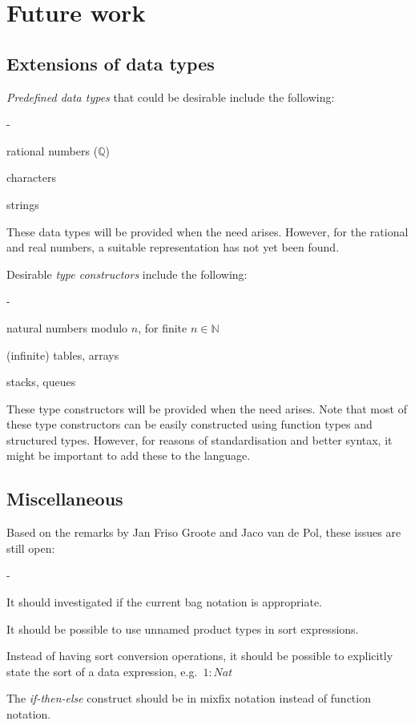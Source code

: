 \documentclass[a4paper,fleqn]{article}
\newenvironment{tdefinitions}[2][0.15em]
  {\begin{list}%
    {#2}%
    {\setlength{\parsep}{0pt}%
     \setlength{\itemsep}{#1}%
     \setlength{\leftmargin}{\mathindent}%
     \setlength{\labelwidth}{\mathindent - \labelsep}%
    }
  }
  {\end{list}}
\newcommand{\frm}[1]{\mbox{\ensuremath{#1}}}
\newcommand{\f}[1]{\ensuremath{\mathit{#1}}}
\newcommand{\nat}{\ensuremath{\mathbb{N}}}
\newlength{\tlength}
\begin{document}
\section{Future work}

\subsection{Extensions of data types}

\emph{Predefined data types} that could be desirable include the following:
\begin{tdefinitions}{-}
\item rational numbers (\frm{\mathbb{Q}})
\item characters
\item strings
\end{tdefinitions}

\noindent
These data types will be provided when the need arises. However, for the
rational and real numbers, a suitable representation has not yet been found.

Desirable \emph{type constructors} include the following:
\begin{tdefinitions}{-}
\item natural numbers modulo \frm{n}, for finite \frm{n \in \nat}
\item (infinite) tables, arrays
\item stacks, queues
\end{tdefinitions}

\noindent
These type constructors will be provided when the need arises. Note that most
of these type constructors can be easily constructed using function types and
structured types. However, for reasons of standardisation and better syntax, it
might be important to add these to the language.

\subsection{Miscellaneous}

Based on the remarks by Jan Friso Groote and Jaco van de Pol, these issues are
still open:
\begin{tdefinitions}{-}
\item It should investigated if the current bag notation is appropriate.
\item It should be possible to use unnamed product types in sort expressions.
\item Instead of having sort conversion operations, it should be possible to
explicitly state the sort of a data expression, e.g.\ \frm{1: \f{Nat}}
\item The \emph{if-then-else} construct should be in mixfix notation instead of
function notation.
\end{tdefinitions}
\end{document}
